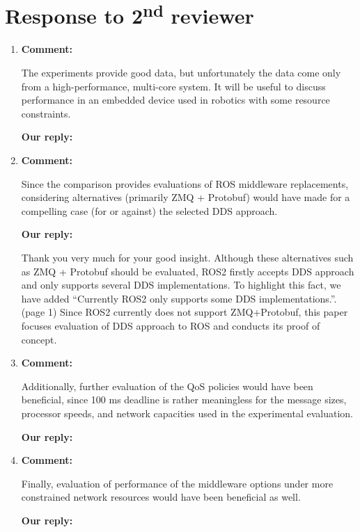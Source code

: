 \documentclass{article}
\newcommand\nd{\textsuperscript{nd}\xspace}
\begin{document}
\newpage


\section{Response to 2\nd reviewer}
\begin{enumerate}

\item \begin{flushleft}
    \textbf{Comment:}
  \end{flushleft}
  The experiments provide good data, but unfortunately the data come only from a high-performance, multi-core system. 
  It will be useful to discuss performance in an embedded device used in robotics with some resource constraints.

  \begin{flushleft}
    \textbf{Our reply:}
  \end{flushleft}


\item \begin{flushleft}
    \textbf{Comment:}
  \end{flushleft}
  Since the comparison provides evaluations of ROS middleware replacements, considering alternatives (primarily ZMQ + Protobuf) would have made for a compelling case (for or against) the selected DDS approach.

  \begin{flushleft}
    \textbf{Our reply:}
  \end{flushleft}
  Thank you very much for your good insight. 
  Although these alternatives such as ZMQ + Protobuf should be evaluated, ROS2 firstly accepts DDS approach and only supports several DDS implementations. 
  To highlight this fact, we have added ``Currently ROS2 only supports some DDS implementations.''. (page 1) 
  Since ROS2 currently does not support ZMQ+Protobuf, this paper focuses evaluation of DDS approach to ROS and conducts its proof of concept.

\item \begin{flushleft}
    \textbf{Comment:}
  \end{flushleft}
  Additionally, further evaluation of the QoS policies would have been beneficial, since 100 ms deadline is rather meaningless for the message sizes, processor speeds, and network capacities used in the experimental evaluation.

  \begin{flushleft}
    \textbf{Our reply:}
  \end{flushleft}


\item \begin{flushleft}
    \textbf{Comment:}
  \end{flushleft}
  Finally, evaluation of performance of the middleware options under more constrained network resources would have been beneficial as well.

  \begin{flushleft}
    \textbf{Our reply:}
  \end{flushleft}

\end{enumerate}
\end{document}
